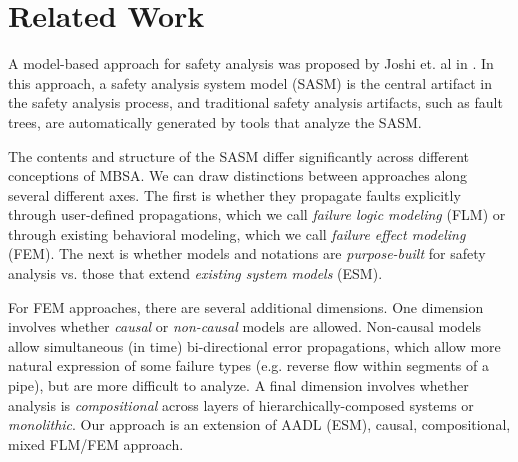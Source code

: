\section{Related Work}
\label{sec:related_work}

A model-based approach for safety analysis was proposed by Joshi et. al in \cite{Joshi05:Dasc, Joshi05:SafeComp, Joshi07:Hase}.  In this approach, a safety analysis system model (SASM) is the central artifact in the safety analysis process, and traditional safety analysis artifacts, such as fault trees, are automatically generated by tools that analyze the SASM.

The contents and structure of the SASM differ significantly across different conceptions of MBSA.  We can draw distinctions between approaches along several different axes.  The first is whether they propagate faults explicitly through user-defined propagations, which we call {\em failure logic modeling} (FLM) or through existing behavioral modeling, which we call {\em failure effect modeling} (FEM).  The next is whether models and notations are {\em purpose-built} for safety analysis vs. those that extend {\em existing system models} (ESM).

For FEM approaches, there are several additional dimensions.  One dimension involves whether {\em causal} or {\em non-causal} models are allowed.  Non-causal models allow simultaneous (in time) bi-directional %
error propagations, which allow more natural expression of some failure types (e.g. reverse flow within segments of a pipe), but are more difficult to analyze.  A final dimension involves whether analysis is {\em compositional} across layers of hierarchically-composed systems or {\em monolithic}.  Our approach is an extension of AADL (ESM), causal, compositional, mixed FLM/FEM approach.



